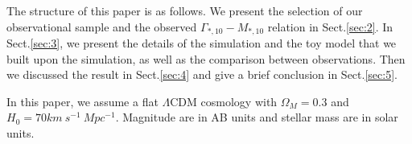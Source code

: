 \documentclass[fleqn,usenatbib]{mnras}
\begin{document}
\par The structure of this paper is as follows. We present the selection of our observational sample and the observed $\Gamma_{*,10} - M_{*,10}$ relation in Sect.\ref{sec:2}. In Sect.\ref{sec:3}, we present the details of the simulation and the toy model that we built upon the simulation, as well as the comparison between observations. Then we discussed the result in Sect.\ref{sec:4} and give a brief conclusion in Sect.\ref{sec:5}.
\par In this paper, we assume a flat $\Lambda$CDM cosmology with $\Omega_M = 0.3$ and $H_0 = 70 km ~s^{-1}~Mpc^{-1}$. Magnitude are in AB units and stellar mass are in solar units.
\end{document}
